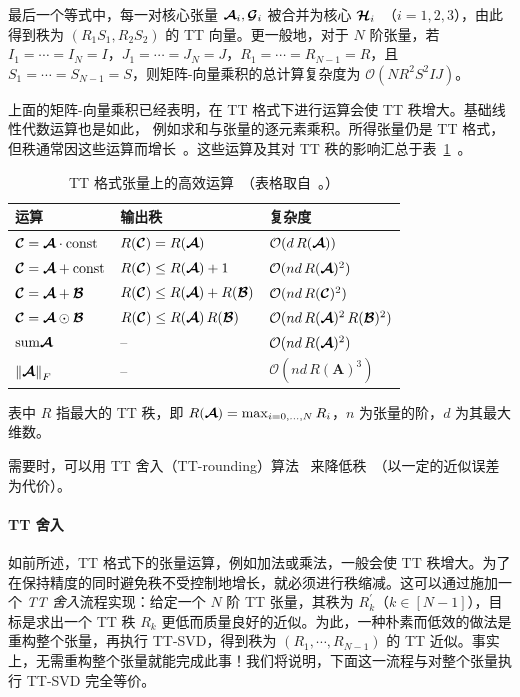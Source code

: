 最后一个等式中，每一对核心张量 $\bm{\mathcal{A}}_i,\bm{\mathcal{G}}_i$ 被合并为核心 $\bm{\mathcal{H}}_i$~（$i = 1,2,3$），由此得到秩为 $(R_1 S_1, R_2 S_2)$ 的 TT 向量。更一般地，对于 $N$ 阶张量，若 $I_1 = \cdots = I_N = I$，$J_1 = \cdots = J_N = J$，$R_1 = \cdots = R_{N-1} = R$，且 $S_1 = \cdots = S_{N-1} = S$，则矩阵-向量乘积的总计算复杂度为 $\mathcal{O}(N R^2 S^2 I J)$。

上面的矩阵-向量乘积已经表明，在 TT 格式下进行运算会使 TT 秩增大。基础线性代数运算也是如此，
例如求和与张量的逐元素乘积。所得张量仍是 TT 格式，但秩通常因这些运算而增长~\citep{oseledets2010approximation}。这些运算及其对 TT 秩的影响汇总于表~\ref{tab:tt-operations}~\citep{novikov2014putting}。
\begin{table}
\centering
\begin{tabular}{lll}
\toprule
\textsc{运算} & \textsc{输出秩} & \textsc{复杂度} \\
\midrule
$\bm{\mathcal{C}} = \bm{\mathcal{A}} \cdot \text{const}$ & $R(\bm{\mathcal{C}}) = R(\bm{\mathcal{A}})$ & $\mathcal{O}(d\,R(\bm{\mathcal{A}}))$ \\
$\bm{\mathcal{C}} = \bm{\mathcal{A}} + \text{const}$ & $R(\bm{\mathcal{C}}) \leq R(\bm{\mathcal{A}}) + 1$ & $\mathcal{O}(nd\,R(\bm{\mathcal{A}})^2)$ \\
$\bm{\mathcal{C}} = \bm{\mathcal{A}} + \bm{\mathcal{B}}$ & $R(\bm{\mathcal{C}}) \leq R(\bm{\mathcal{A}}) + R(\bm{\mathcal{B}})$ & $\mathcal{O}(nd\,R(\bm{\mathcal{C}})^2)$ \\
$\bm{\mathcal{C}} = \bm{\mathcal{A}} \odot \bm{\mathcal{B}}$ & $R(\bm{\mathcal{C}}) \leq R(\bm{\mathcal{A}})\,R(\bm{\mathcal{B}})$ & $\mathcal{O}(nd\,R(\bm{\mathcal{A}})^2\,R(\bm{\mathcal{B}})^2)$ \\
$\mathrm{sum} \bm{\mathcal{A}}$ & -- & $\mathcal{O}(nd\,R(\bm{\mathcal{A}})^2)$ \\
$\left\lVert\bm{\mathcal{A}}\right\rVert_F$ & -- & $\mathcal{O}(nd\,R(\mathbf{A})^3)$ \\
\bottomrule
\end{tabular}
\caption{ TT 格式张量上的高效运算~（表格取自~\citep{novikov2014putting}。）}
\label{tab:tt-operations}
\end{table}
表中 $R$ 指最大的 TT 秩，即 $R(\bm{\mathcal{A}}) = \max_{i=0,\dots,N} R_i$，$n$ 为张量的阶，$d$ 为其最大维数。

需要时，可以用 TT 舍入（TT-rounding）算法~\citep{oseledets2010approximation} 来降低秩~（以一定的近似误差为代价）。

\paragraph{TT 舍入} 如前所述，TT 格式下的张量运算，例如加法或乘法，一般会使 TT 秩增大。为了在保持精度的同时避免秩不受控制地增长，就必须进行秩缩减。这可以通过施加一个 \emph{TT 舍入}流程实现：给定一个 $N$ 阶 TT 张量，其秩为 $R^\prime_k$（$k\in[N-1]$），目标是求出一个 TT 秩 $R_k$ 更低而质量良好的近似。为此，一种朴素而低效的做法是重构整个张量，再执行 TT-SVD，得到秩为 $(R_1,\cdots,R_{N-1})$ 的 TT 近似。事实上，无需重构整个张量就能完成此事！我们将说明，下面这一流程与对整个张量执行 TT-SVD 完全等价。

